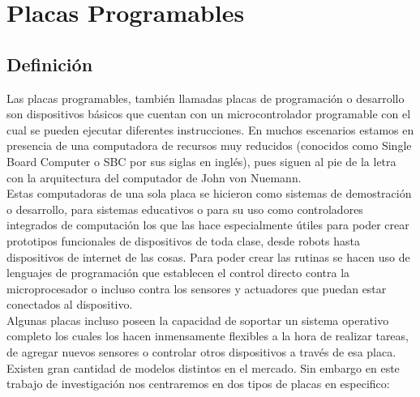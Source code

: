 

\chapter{Placas Programables}

\section{Definición}
Las placas programables, también llamadas placas de programación o desarrollo son dispositivos básicos que cuentan con un microcontrolador programable con el cual se pueden ejecutar diferentes instrucciones. En muchos escenarios estamos en presencia de una computadora de recursos muy reducidos (conocidos como Single Board Computer o SBC por sus siglas en inglés), pues siguen al pie de la letra con la arquitectura del computador de John von Nuemann\cite{arquitecturaComputador}.\\ 

Estas computadoras de una sola placa se hicieron como sistemas de demostración o desarrollo, para sistemas educativos o para su uso como controladores integrados de computación los que las hace especialmente útiles para poder crear prototipos funcionales de dispositivos de toda clase, desde robots hasta dispositivos de internet de las cosas. Para poder crear las rutinas se hacen uso de lenguajes de programación que establecen el control directo contra la microprocesador o incluso contra los sensores y actuadores que puedan estar conectados al dispositivo.\\

Algunas placas incluso poseen la capacidad de soportar un sistema operativo completo los cuales los hacen inmensamente flexibles a la hora de realizar tareas, de agregar nuevos sensores o controlar otros dispositivos a través de esa placa. Existen gran cantidad de modelos distintos en el mercado. Sin embargo en este trabajo de investigación nos centraremos en dos tipos de placas en especifico:

